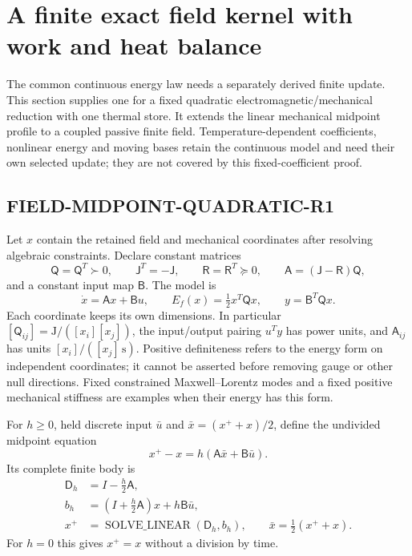 \section{A finite exact field kernel with work and heat balance}
\label{sec:r14-field-step}
The common continuous energy law needs a separately derived finite update.
This section supplies one for a fixed quadratic electromagnetic/mechanical
reduction with one thermal store. It extends the linear mechanical midpoint
profile to a coupled passive finite field. Temperature-dependent coefficients,
nonlinear energy and moving bases retain the continuous model and need their
own selected update; they are not covered by this fixed-coefficient proof.

\subsection{FIELD-MIDPOINT-QUADRATIC-R1}
Let $x$ contain the retained field and mechanical coordinates after resolving
algebraic constraints. Declare constant matrices
\begin{equation}
 \mathsf Q=\mathsf Q^T\succ0,\qquad
 \mathsf J^T=-\mathsf J,\qquad
 \mathsf R=\mathsf R^T\succeq0,\qquad
 \mathsf A=(\mathsf J-\mathsf R)\mathsf Q,
\end{equation}
and a constant input map $\mathsf B$. The model is
\begin{equation}
 \dot x=\mathsf A x+\mathsf B u,\qquad
 E_f(x)=\tfrac12 x^T\mathsf Qx,\qquad
 y=\mathsf B^T\mathsf Qx.
 \label{eq:r14-field-linear}
\end{equation}
Each coordinate keeps its own dimensions. In particular
$[\mathsf Q_{ij}]=\mathrm{J}/([x_i][x_j])$, the input/output pairing
$u^Ty$ has power units, and $\mathsf A_{ij}$ has units
$[x_i]/([x_j]\,\mathrm{s})$. Positive definiteness refers to the energy form
on independent coordinates; it cannot be asserted before removing gauge or
other null directions. Fixed constrained Maxwell--Lorentz modes and a fixed
positive mechanical stiffness are examples when their energy has this form.

For $h\ge0$, held discrete input $\bar u$ and
$\bar x=(x^++x)/2$, define the undivided midpoint equation
\begin{equation}
 x^+-x=h(\mathsf A\bar x+\mathsf B\bar u).
 \label{eq:r14-field-midpoint}
\end{equation}
Its complete finite body is
\begin{align}
 \mathsf D_h&=I-\tfrac h2\mathsf A,\nonumber\\
 b_h&=(I+\tfrac h2\mathsf A)x+h\mathsf B\bar u,\nonumber\\
 x^+&=\operatorname{SOLVE\_LINEAR}(\mathsf D_h,b_h),
 \qquad \bar x=\tfrac12(x^++x).
 \label{eq:r14-field-solve}
\end{align}
For $h=0$ this gives $x^+=x$ without a division by time.

